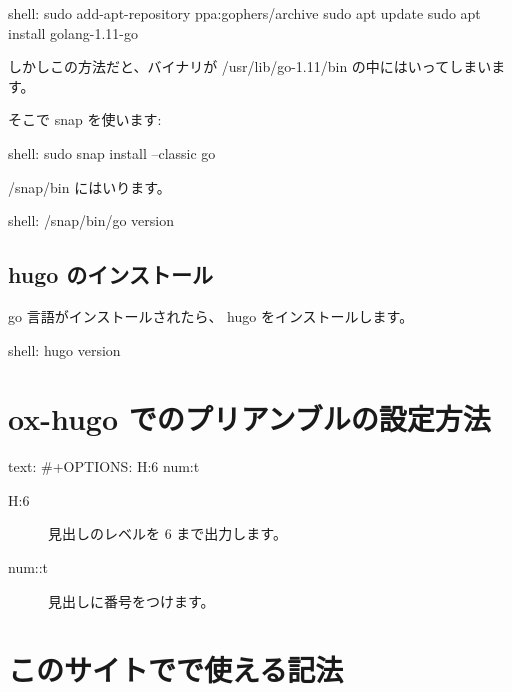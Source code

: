 \documentclass[dvipdfmx,a4j,14pt,uplatex,openany]{jsbook}
\begin{document}
\begin{programlist}[label={nil}]{shell}{: }sudo add-apt-repository ppa:gophers/archive
sudo apt update
sudo apt install golang-1.11-go
\end{programlist}

しかしこの方法だと、バイナリが /usr/lib/go-1.11/bin の中にはいってしまいます。

そこで snap を使います:

\begin{programlist}[label={nil}]{shell}{: }sudo snap install --classic go
\end{programlist}

/snap/bin にはいります。

\begin{programlist}[label={nil}]{shell}{: }/snap/bin/go version
\end{programlist}


\section{hugo のインストール}
\label{sec:org6cbd80c}
go 言語がインストールされたら、 hugo をインストールします。



\begin{programlist}[label={nil}]{shell}{: }hugo version
\end{programlist}

\chapter{ox-hugo でのプリアンブルの設定方法}
\label{sec:orgc1b71ea}
\begin{programlist}[label={nil}]{text}{: }#+OPTIONS: H:6 num:t
\end{programlist}

\begin{description}
\item[{H:6}] 見出しのレベルを 6 まで出力します。
\item[{num::t}] 見出しに番号をつけます。
\end{description}
\chapter{このサイトでで使える記法}
\label{sec:orgd2ae0ab}
\end{document}
